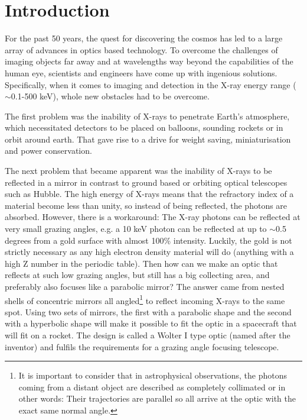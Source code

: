 \chapter{Introduction}
For the past 50 years, the quest for discovering the cosmos has led to a large array of advances in optics based technology. To overcome the challenges of imaging objects far away and at wavelengths way beyond the capabilities of the human eye, scientists and engineers have come up with ingenious solutions. Specifically, when it comes to imaging and detection in the X-ray energy range ($\sim$0.1-500 keV), whole new obstacles had to be overcome.

The first problem was the inability of X-rays to penetrate Earth's atmosphere, which necessitated detectors to be placed on balloons, sounding rockets or in orbit around earth. That gave rise to a drive for weight saving, miniaturisation and power conservation.

The next problem that became apparent was the inability of X-rays to be reflected in a mirror in contrast to ground based or orbiting optical telescopes such as Hubble. The high energy of X-rays means that the refractory index of a material become less than unity, so instead of being reflected, the photons are absorbed. However, there is a workaround: The X-ray photons can be reflected at very small grazing angles, e.g. a 10 keV photon can be reflected at up to $\sim$0.5 degrees from a gold surface with almost 100\% intensity. Luckily, the gold is not strictly necessary as any high electron density material will do (anything with a high Z number in the periodic table). Then how can we make an optic that reflects at such low grazing angles, but still has a big collecting area, and preferably also focuses like a parabolic mirror? The answer came from nested shells of concentric mirrors all angled\footnote{It is important to consider that in astrophysical observations, the photons coming from a distant object are described as completely collimated or in other words: Their trajectories are parallel so all arrive at the optic with the exact same normal angle.} to reflect incoming X-rays to the same spot. Using two sets of mirrors, the first with a parabolic shape and the second with a hyperbolic shape will make it possible to fit the optic in a spacecraft that will fit on a rocket. The design is called a Wolter I type optic\cite{Wolter:1952gt,Wolter:1952ih} (named after the inventor) and fulfils the requirements for a grazing angle focusing telescope.


